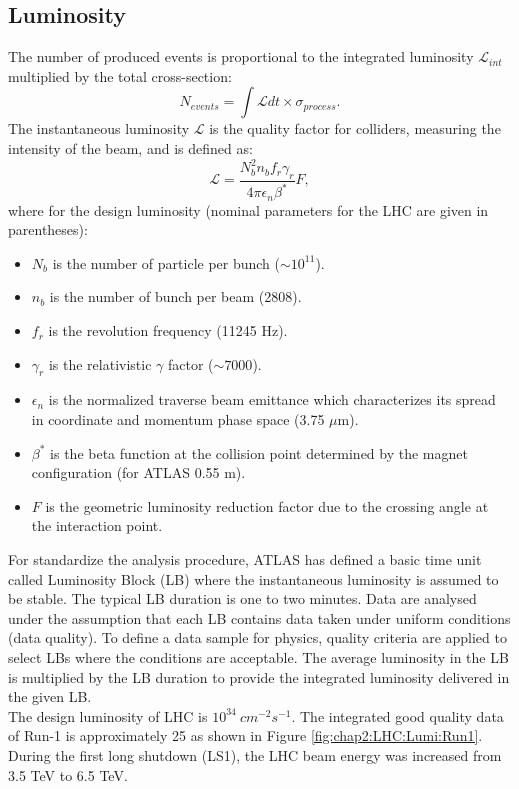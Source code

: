 \subsection{Luminosity}
\label{chap2:LHC:Lumi}
The number of produced events is proportional to the integrated luminosity $\mathcal{L}_{int}$ multiplied by the total cross-section: 
\begin{equation}
N_{events} = \int\mathcal{L} dt \times \sigma_{process}.
\end{equation}
The instantaneous luminosity $\mathcal{L}$ is the quality factor for colliders, measuring the intensity of the beam, and is defined as:
\begin{equation}
\mathcal{L} = \frac{N_b^2n_bf_r\gamma_r}{4\pi\epsilon_n\beta^*}F,
\end{equation}
where for the design luminosity (nominal parameters for the LHC are given in parentheses):
\begin{itemize}
	\item $N_b$ is the number of particle per bunch ($\sim10^{11}$).
	\item $n_b$ is the number of bunch per beam (2808).
	\item $f_r$ is the revolution frequency (11245 Hz).
	\item $\gamma_r$ is the relativistic $\gamma$ factor ($\sim 7000$).
	\item $\epsilon_n$ is the normalized traverse beam emittance which characterizes its spread in coordinate and momentum phase space (3.75 $\mu$m).
	\item $\beta^*$ is the beta function at the collision point determined by the magnet configuration (for ATLAS 0.55 m).
	\item $F$ is the geometric luminosity reduction factor due to the crossing angle at the interaction point.
\end{itemize}
For standardize the analysis procedure, ATLAS has defined a basic time unit called Luminosity Block (LB) where the instantaneous luminosity is assumed to be stable. The typical LB duration is one to two minutes. Data are analysed under the assumption that each LB contains data taken under uniform conditions (data quality). To define a data sample for physics, quality criteria are applied to select LBs where the conditions are acceptable. The average luminosity in the LB is multiplied by the LB duration to provide the integrated luminosity delivered in the given LB. \\
The design luminosity of LHC is $10^{34} \ cm^{-2}s^{-1}$. The integrated good quality data of Run-1 is approximately 25 \ifb as shown in Figure \ref{fig:chap2:LHC:Lumi:Run1}. During the first long shutdown (LS1), the LHC beam energy was increased from 3.5 TeV to 6.5 TeV. 
